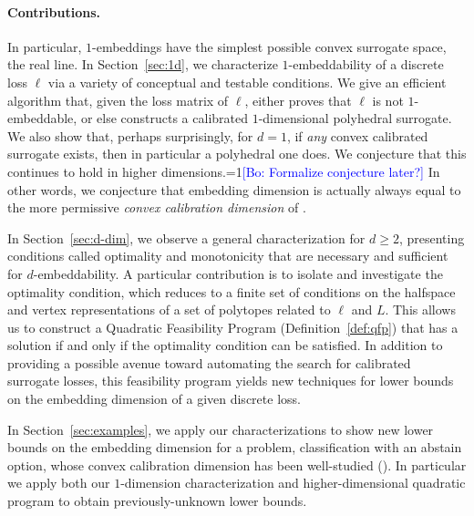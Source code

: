 \documentclass[anon]{colt2020} %
\newcommand{\Comments}{1}
\newcommand{\mynote}[2]{\ifnum\Comments=1\textcolor{#1}{#2}\fi}
\newcommand{\bo}[1]{\mynote{blue}{[Bo: #1]}}
\begin{document}
\paragraph{Contributions.}
In particular, $1$-embeddings have the simplest possible convex surrogate space, the real line.
In Section~\ref{sec:1d}, we characterize $1$-embeddability of a discrete loss $\ell$ via a variety of conceptual and testable conditions.
We give an efficient algorithm that, given the loss matrix of $\ell$, either proves that $\ell$ is not $1$-embeddable, or else constructs a calibrated $1$-dimensional polyhedral surrogate.
We also show that, perhaps surprisingly, for $d=1$, if \emph{any} convex calibrated surrogate exists, then in particular a polyhedral one does.
We conjecture that this continues to hold in higher dimensions.\bo{Formalize conjecture later?}
In other words, we conjecture that embedding dimension is actually always equal to the more permissive \emph{convex calibration dimension} of \cite{ramaswamy2016convex}.

In Section~\ref{sec:d-dim}, we observe a general characterization for $d \geq 2$, presenting conditions called optimality and monotonicity that are necessary and sufficient for $d$-embeddability.
A particular contribution is to isolate and investigate the optimality condition, which reduces to a finite set of conditions on the halfspace and vertex representations of a set of polytopes related to $\ell$ and $L$.
This allows us to construct a Quadratic Feasibility Program (Definition~\ref{def:qfp}) that has a solution if and only if the optimality condition can be satisfied.
In addition to providing a possible avenue toward automating the search for calibrated surrogate losses, this feasibility program yields new techniques for lower bounds on the embedding dimension of a given discrete loss.

In Section~\ref{sec:examples}, we apply our characterizations to show new lower bounds on the embedding dimension for a problem, classification with an abstain option, whose convex calibration dimension has been well-studied (\cite{ramaswamy2016convex, ramaswamy2018consistent}).
In particular we apply both our $1$-dimension characterization and higher-dimensional quadratic program to obtain previously-unknown lower bounds.
\end{document}
